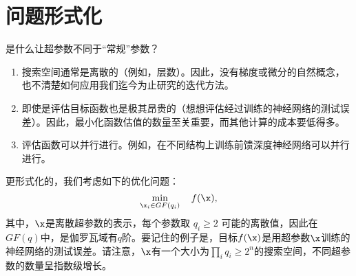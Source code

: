 \section{
	问题形式化
	}

是什么让超参数不同于“常规”参数？
\begin{enumerate}
	\setlength{\itemsep}{0pt}

	\item 
	搜索空间通常是离散的（例如，层数）。因此，没有梯度或微分的自然概念，也不清楚如何应用我们迄今为止研究的迭代方法。

	\item 
	即使是评估目标函数也是极其昂贵的（想想评估经过训练的神经网络的测试误差）。因此，最小化函数估值的数量至关重要，而其他计算的成本要低得多。

	\item 
	评估函数可以并行进行。例如，在不同结构上训练前馈深度神经网络可以并行进行。
\end{enumerate}


更形式化的，我们考虑如下的优化问题：
\begin{equation*}
    \min_{\x_i \in GF(q_i) } \quad f(\x),
\end{equation*}
其中，$\x$是离散超参数的表示，每个参数取 $q_i \geq 2 $ 可能的离散值，因此在$GF(q)$中，是伽罗瓦域有$q$阶。要记住的例子是，目标$f(\x)$是用超参数$\x$训练的神经网络的测试误差。请注意，$\x$有一个大小为$\prod_i q_i \geq 2^n $的搜索空间，不同超参数的数量呈指数级增长。

